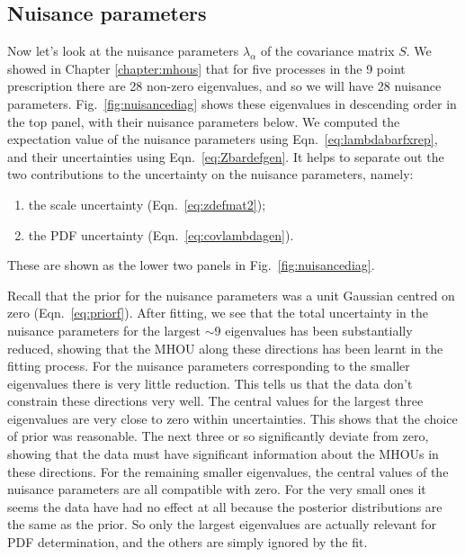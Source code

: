 \subsection{Nuisance parameters} 
Now let's look at the nuisance parameters $\lambda_\alpha$ of the covariance matrix $S$. We showed in Chapter \ref{chapter:mhous} that for five processes in the 9 point prescription there are 28 non-zero eigenvalues, and so we will have 28 nuisance parameters. Fig.~\ref{fig:nuisancediag} shows these eigenvalues in descending order in the top panel, with their nuisance parameters below. We computed the expectation value of the nuisance parameters using Eqn.~\ref{eq:lambdabarfxrep}, and their uncertainties using Eqn.~\ref{eq:Zbardefgen}. 
It helps to separate out the two contributions to the uncertainty on the nuisance parameters, namely:
\begin{enumerate}
\item the scale uncertainty (Eqn.~\ref{eq:zdefmat2});
\item the PDF uncertainty (Eqn.~\ref{eq:covlambdagen}).
\end{enumerate}
These are shown as the lower two panels in Fig.~\ref{fig:nuisancediag}. 

Recall that the prior for the nuisance parameters was a unit Gaussian centred on zero (Eqn.~\ref{eq:priorf}). After fitting, we see that the total uncertainty in the nuisance parameters for the largest $\sim$9 eigenvalues has been substantially reduced, showing that the MHOU along these directions has been learnt in the fitting process. For the nuisance parameters corresponding to the smaller eigenvalues there is very little reduction. This tells us that the data don't constrain these directions very well. The central values for the largest three eigenvalues are very close to zero within uncertainties. This shows that the choice of prior was reasonable. The next three or so significantly deviate from zero, showing that the data must have significant information about the MHOUs in these directions. For the remaining smaller eigenvalues, the central values of the nuisance parameters are all compatible with zero. For the very small ones it seems the data have had no effect at all because the posterior distributions are the same as the prior. So only the largest eigenvalues are actually relevant for PDF determination, and the others are simply ignored by the fit.

